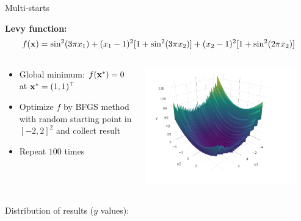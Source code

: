 \documentclass[11pt,compress,t,notes=noshow, xcolor=table]{beamer}
\begin{document}
\begin{vbframe}{Multi-starts}

\footnotesize

\textbf{Levy function:}
\begin{equation*}
    f(\mathbf{x}) = \sin^2(3\pi x_1) + (x_1 - 1)^2 [1 + \sin^2(3\pi x_2)] + (x_2 -1)^2[1 + \sin^2(2\pi x_2)]
\end{equation*}

\vspace{-\baselineskip}

\begin{columns}
\begin{column}[c]{0.5\textwidth}
   \footnotesize
  \vspace{-0.2cm}
  \begin{itemize}
    \item Global minimum: $f(\mathbf{x}^*) = 0$ at $\mathbf{x}^* = (1,1)^\top$
    \item Optimize $f$ by BFGS method with random starting point in $[-2,2]^2$ and collect result
    \item Repeat $100$ times
    \end{itemize}
\end{column}
\begin{column}[c]{0.5\textwidth}
    \begin{center}
  \includegraphics[width = 0.9\textwidth]{figure_man/levy.png}
  \end{center}
\end{column}
\end{columns}

Distribution of results ($y$ values):
\vspace{0.1cm}


\end{vbframe}
\end{document}
